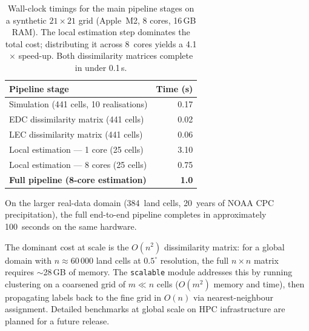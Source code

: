\documentclass[preprint,12pt,a4paper]{elsarticle}
\begin{document}
\begin{table}[ht]
\centering
\begin{tabular}{lr}
\toprule
\textbf{Pipeline stage} & \textbf{Time (s)} \\
\midrule
Simulation (441 cells, 10 realisations) & 0.17 \\
EDC dissimilarity matrix (441 cells) & 0.02 \\
LEC dissimilarity matrix (441 cells) & 0.06 \\
Local estimation --- 1 core (25 cells) & 3.10 \\
Local estimation --- 8 cores (25 cells) & 0.75 \\
\midrule
\textbf{Full pipeline (8-core estimation)} & \textbf{1.0} \\
\bottomrule
\end{tabular}
\caption{Wall-clock timings for the main pipeline stages on a
  synthetic $21\times 21$ grid (Apple~M2, 8 cores, 16\,GB RAM).
  The local estimation step dominates the total cost; distributing
  it across 8~cores yields a 4.1$\times$ speed-up.  Both
  dissimilarity matrices complete in under 0.1\,s.}
\label{tab:benchmark}
\end{table}

On the larger real-data domain (384~land cells, 20~years of NOAA CPC
precipitation), the full end-to-end pipeline completes in
approximately 100~seconds on the same hardware.

The dominant cost at scale is the $O(n^2)$ dissimilarity matrix:
for a global domain with $n \approx 60\,000$ land cells at
$0.5^\circ$ resolution, the full $n \times n$ matrix requires
$\sim$28\,GB of memory.  The \texttt{scalable} module addresses
this by running clustering on a coarsened grid of $m \ll n$ cells
($O(m^2)$ memory and time), then propagating labels back to the
fine grid in $O(n)$ via nearest-neighbour assignment.  Detailed
benchmarks at global scale on HPC infrastructure are planned for a
future release.
\end{document}
